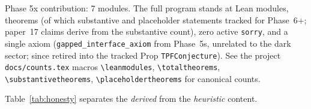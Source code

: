 \documentclass[aps,prd,twocolumn,showpacs,superscriptaddress,nofootinbib]{revtex4-2}
\begin{document}
Phase 5x contribution: 7 modules. The full program stands at
\leanmodules{} Lean modules, \totaltheorems{} theorems (of which
\substantivetheorems{} substantive and \placeholdertheorems{}
placeholder statements tracked for Phase~6+; paper~17 claims derive
from the substantive count), zero active \texttt{sorry}, and a single
axiom
(\texttt{gapped\_interface\_axiom} from Phase~5s, unrelated to the
dark sector; since retired into the tracked Prop
\texttt{TPFConjecture}). See the project \texttt{docs/counts.tex} macros
\texttt{\textbackslash{}leanmodules}, \texttt{\textbackslash{}totaltheorems},
\texttt{\textbackslash{}substantivetheorems}, \texttt{\textbackslash{}placeholdertheorems}
for canonical counts.

Table~\ref{tab:honesty} separates the \emph{derived} from the
\emph{heuristic} content.
\end{document}
